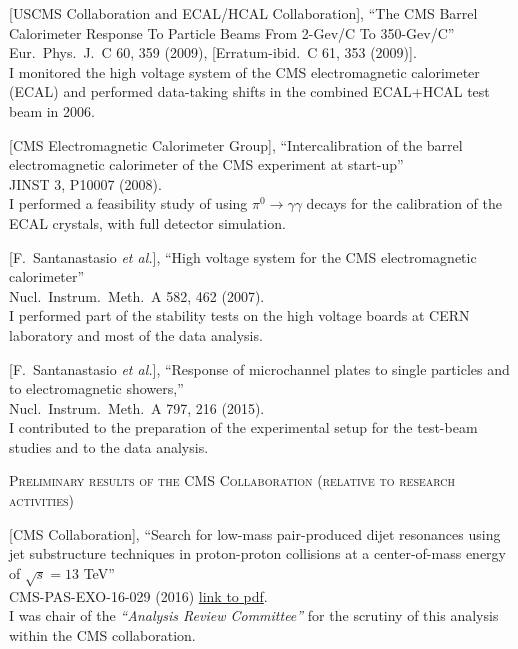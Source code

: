 \documentclass[10pt, a4paper]{article}
\begin{document}
\begin{thebibliography}{599}
[USCMS Collaboration and ECAL/HCAL Collaboration],
``The CMS Barrel Calorimeter Response To Particle Beams From 2-Gev/C To 350-Gev/C''\\
Eur.\ Phys.\ J.\  C 60, 359 (2009), [Erratum-ibid.\  C 61, 353 (2009)].\\
I monitored the high voltage system of the CMS electromagnetic
calorimeter (ECAL) and performed data-taking shifts in the combined ECAL+HCAL test beam in 2006.

[CMS Electromagnetic Calorimeter Group],
``Intercalibration of the barrel electromagnetic calorimeter of the CMS  experiment at start-up''\\
JINST 3, P10007 (2008).
\\ I performed a feasibility study of using $\pi^0 \rightarrow \gamma \gamma$ decays for the calibration of the ECAL crystals, with full detector simulation.

 [F.~Santanastasio {\it et al.}],
``High voltage system for the CMS electromagnetic calorimeter''\\
 Nucl.\ Instrum.\ Meth.\  A 582, 462 (2007).
 \\ I performed part of the stability tests on the high voltage boards at CERN laboratory and most of the data analysis. 

[F.~Santanastasio {\it et al.}],
  ``Response of microchannel plates to single particles and to electromagnetic showers,''\\
Nucl.\ Instrum.\ Meth.\ A 797, 216 (2015).\\
I contributed to the preparation of the experimental setup for the
test-beam studies and to the data analysis.


\vspace{0.1cm} \begin{center} \textsc{Preliminary results of the CMS Collaboration (relative to research activities)} \end{center} \vspace{0.05cm}

  [CMS Collaboration], 
  ``Search for low-mass
  pair-produced dijet resonances using jet substructure techniques in
  proton-proton collisions at a center-of-mass energy of $\sqrt{s}=13$
  TeV''\\
  CMS-PAS-EXO-16-029 (2016)
  \href{http://cds.cern.ch/record/2231062/files/EXO-16-029-pas.pdf}{link
    to pdf}.
  \\ I was chair of the {\it``Analysis Review Committee''} for the scrutiny of this analysis within the CMS collaboration. 


\end{thebibliography}
\end{document}
